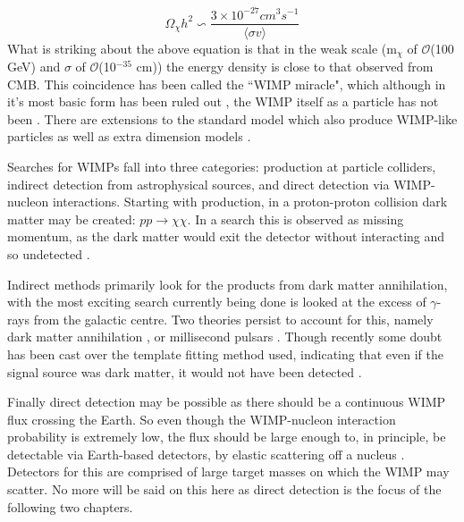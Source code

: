 \begin{equation}
    \Omega_\chi h^2 \backsim \frac{3\times 10^{-27} cm^3s^{-1}}{ \langle \sigma v \rangle}
\end{equation}
What is striking about the above equation is that in the weak scale (m$_\chi$ of $\mathcal{O}$(100 GeV) and $\sigma$ of $\mathcal{O}$(10$^{-35}$ cm)) the energy density is close to that observed from CMB.
This coincidence has been called the ``WIMP miracle", which although in it's most basic form has been ruled out \cite{less_of_a_wimp_miracle_ref}, the WIMP itself as a particle has not been \cite{wimp_theory_ref}.
There are extensions to the standard model which also produce WIMP-like particles \cite{supersymetry_wimpy_boi_ref,supersymetry_wimpy_again_ref} as well as extra dimension models \cite{extradimention_wimps_ref}.

\par
Searches for WIMPs fall into three categories: production at particle colliders, indirect detection from astrophysical sources, and direct detection via WIMP-nucleon interactions.
Starting with production, in a proton-proton collision dark matter may be created: $pp\xrightarrow{}\chi\chi$.
In a search this is observed as missing momentum, as the dark matter would exit the detector without interacting and so undetected \cite{lhc_darkmatter_ref}.
\par
Indirect methods primarily look for the products from dark matter annihilation, with the most exciting search currently being done is looked at the excess of $\gamma$-rays from the galactic centre.
Two theories persist to account for this, namely dark matter annihilation \cite{galactic_gamma_excess_1_ref, galactic_gamma_excess_2_ref}, or millisecond pulsars \cite{galactic_gamma_excess_3_ref, galactic_gamma_excess_4_ref}.
Though recently some doubt has been cast over the template fitting method used, indicating that even if the signal source was dark matter, it would not have been detected \cite{galactic_gamma_excess_5_ref}.
\par
Finally direct detection may be possible as there should be a continuous WIMP flux crossing the Earth.
So even though the WIMP-nucleon interaction probability is extremely low, the flux should be large enough to, in principle, be detectable via Earth-based detectors, by elastic scattering off a nucleus \cite{wimp_nucleon_interactions_first_suggestion_ref,supersymmetric_dark_matter_ref}.
Detectors for this are comprised of large target masses on which the WIMP may scatter.
No more will be said on this here as direct detection is the focus of the following two chapters.

